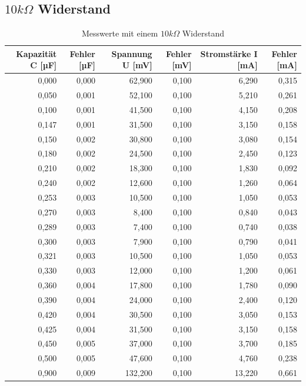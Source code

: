 \subsection{$10 k\Omega$ Widerstand}
\begin{table}[h]
  \centering
  
    \begin{tabular}{rrrrrr}
    \toprule
    Kapazität C [µF] & Fehler [µF] & Spannung U [mV] & Fehler [mV] & Stromstärke I [mA] & Fehler [mA] \\
    \midrule
    
        0,000 & 0,000 & 62,900 & 0,100 & 6,290 & 0,315 \\
        0,050 & 0,001 & 52,100 & 0,100 & 5,210 & 0,261 \\
        0,100 & 0,001 & 41,500 & 0,100 & 4,150 & 0,208 \\
        0,147 & 0,001 & 31,500 & 0,100 & 3,150 & 0,158 \\
        0,150 & 0,002 & 30,800 & 0,100 & 3,080 & 0,154 \\
        0,180 & 0,002 & 24,500 & 0,100 & 2,450 & 0,123 \\
        0,210 & 0,002 & 18,300 & 0,100 & 1,830 & 0,092 \\
        0,240 & 0,002 & 12,600 & 0,100 & 1,260 & 0,064 \\
        0,253 & 0,003 & 10,500 & 0,100 & 1,050 & 0,053 \\
        0,270 & 0,003 & 8,400 & 0,100 & 0,840 & 0,043 \\
        0,289 & 0,003 & 7,400 & 0,100 & 0,740 & 0,038 \\
        0,300 & 0,003 & 7,900 & 0,100 & 0,790 & 0,041 \\
        0,321 & 0,003 & 10,500 & 0,100 & 1,050 & 0,053 \\
        0,330 & 0,003 & 12,000 & 0,100 & 1,200 & 0,061 \\
        0,360 & 0,004 & 17,800 & 0,100 & 1,780 & 0,090 \\
        0,390 & 0,004 & 24,000 & 0,100 & 2,400 & 0,120 \\
        0,420 & 0,004 & 30,500 & 0,100 & 3,050 & 0,153 \\
        0,425 & 0,004 & 31,500 & 0,100 & 3,150 & 0,158 \\
        0,450 & 0,005 & 37,000 & 0,100 & 3,700 & 0,185 \\
        0,500 & 0,005 & 47,600 & 0,100 & 4,760 & 0,238 \\
        0,900 & 0,009 & 132,200 & 0,100 & 13,220 & 0,661 \\
    
    \bottomrule
    \end{tabular}
  \caption{Messwerte mit einem $10 k\Omega$ Widerstand}
  \label{tab:10kparallel}
\end{table}

